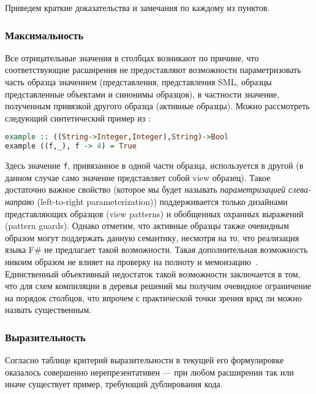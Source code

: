 Приведем краткие доказательства и замечания по каждому из \mbox{пунктов}.

\subsubsection{Максимальность}

Все отрицательные значения в столбцах возникают по причине, что соответствующие расширения не предоставляют возможности параметризовать часть образца значением (представления, представления SML, образцы представленные объектами и синонимы образцов), в частности значение, полученным привязкой другого образца (активные образцы). Можно рассмотреть следующий синтетический пример из \cite{viewshaskell}:

\noindent
\begin{minipage}{\linewidth}
\begin{lstlisting}[language=haskell, escapechar=@]
example :: ((String->Integer,Integer),String)->Bool
example ((f,_), f -> 4) = True
\end{lstlisting}
\end{minipage}

Здесь значение \lstinline|f|, привязанное в одной части образца, используется в другой (в данном случае само значение представляет собой view образец). Такое достаточно важное свойство (которое мы будет называть \textit{параметризацией слева-направо} (left-to-right parameterization)) поддерживается только дизайнами представляющих образцов (view patterns) и обобщенных охранных выражений (pattern guards). Однако отметим, что активные образцы также очевидным образом могут поддержать данную семантику, несмотря на то, что реализация языка F\# не предлагает такой возможности. Такая дополнительная возможность никоим образом не влияет на проверку на полноту и мемоизацию~\cite{okasaki98views}. Единственный объективный недостаток такой возможности заключается в том, что для схем компиляции в деревья решений мы получим очевидное ограничение на порядок столбцов, что впрочем с практической точки зрения вряд ли можно назвать существенным.

\subsubsection{Выразительность}

Согласно таблице критерий выразительности в текущей его формулировке оказалось совершенно нерепрезентативен --- при любом расширении так или иначе существует пример, требующий дублирования кода.

